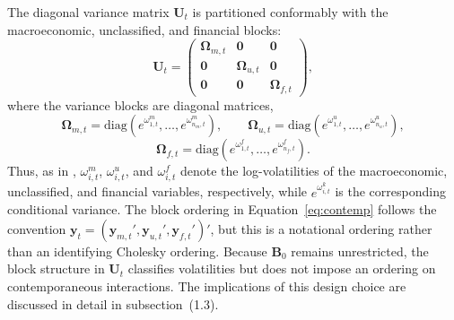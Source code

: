 The diagonal variance matrix $\mathbf{U}_t$ is partitioned conformably with the macroeconomic, unclassified, and financial blocks:
%
\begin{equation}
\mathbf{U}_t =
\begin{pmatrix}
\boldsymbol{\Omega}_{m,t} & \mathbf{0} & \mathbf{0} \\
\mathbf{0} & \boldsymbol{\Omega}_{u,t} & \mathbf{0} \\
\mathbf{0} & \mathbf{0} & \boldsymbol{\Omega}_{f,t}
\end{pmatrix},
\label{eq:contemp}
\end{equation}
%
where the variance blocks are diagonal matrices,
%
\[
\boldsymbol{\Omega}_{m,t}
= \mathrm{diag}\!\left(e^{\omega_{1,t}^{m}},\ldots,e^{\omega_{n_m,t}^{m}}\right), \qquad
\boldsymbol{\Omega}_{u,t}
= \mathrm{diag}\!\left(e^{\omega_{1,t}^{u}},\ldots,e^{\omega_{n_u,t}^{u}}\right),
\]
\[
\boldsymbol{\Omega}_{f,t}
= \mathrm{diag}\!\left(e^{\omega_{1,t}^{f}},\ldots,e^{\omega_{n_f,t}^{f}}\right).
\]
Thus, as in \citet{davidson2025investigating}, $\omega_{i,t}^{m}$, $\omega_{i,t}^{u}$, and $\omega_{i,t}^{f}$ denote the log-volatilities of the macroeconomic, unclassified, and financial variables, respectively, while $e^{\omega_{i,t}^{k}}$ is the corresponding conditional variance. The block ordering in Equation~\eqref{eq:contemp} follows the convention $\mathbf{y}_t=(\mathbf{y}_{m,t}',\mathbf{y}_{u,t}',\mathbf{y}_{f,t}')'$, but this is a notational ordering rather than an identifying Cholesky ordering. Because $\mathbf{B}_0$ remains unrestricted, the block structure in $\mathbf{U}_t$ classifies volatilities but does not impose an ordering on contemporaneous interactions. The implications of this design choice are discussed in detail in subsection~(1.3).

